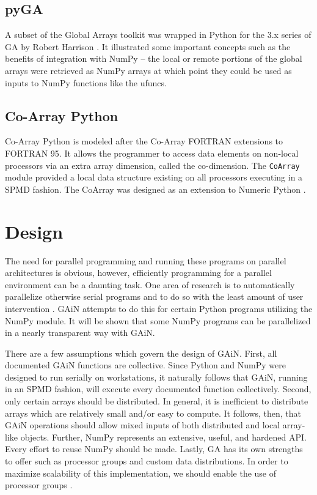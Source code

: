 \documentclass{sigplanconf}
\begin{document}
\subsection{pyGA}

A subset of the Global Arrays toolkit was wrapped in Python for the 3.x series
of GA by Robert Harrison \cite{Har99}. It illustrated some important concepts
such as the benefits of integration with NumPy -- the local or remote portions
of the global arrays were retrieved as NumPy arrays at which point they could
be used as inputs to NumPy functions like the ufuncs.

\subsection{Co-Array Python}

Co-Array Python \cite{Ras04} is modeled after the Co-Array FORTRAN extensions
to FORTRAN 95. It allows the programmer to access data elements on non-local
processors via an extra array dimension, called the co-dimension. The
\verb=CoArray= module provided a local data structure existing on all
processors executing in a SPMD fashion. The CoArray was designed as an
extension to Numeric Python \cite{Asc99}.

\section{Design}

The need for parallel programming and running these programs on parallel
architectures is obvious, however, efficiently programming for a parallel
environment can be a daunting task. One area of research is to automatically
parallelize otherwise serial programs and to do so with the least amount of
user intervention \cite{Buy99}. GAiN attempts to do this for certain Python
programs utilizing the NumPy module. It will be shown that some NumPy programs
can be parallelized in a nearly transparent way with GAiN.

There are a few assumptions which govern the design of GAiN. First, all
documented GAiN functions are collective. Since Python and NumPy were designed
to run serially on workstations, it naturally follows that GAiN, running in an
SPMD fashion, will execute every documented function collectively. Second,
only certain arrays should be distributed. In general, it is inefficient to
distribute arrays which are relatively small and/or easy to compute. It
follows, then, that GAiN operations should allow mixed inputs of both
distributed and local array-like objects. Further, NumPy represents an
extensive, useful, and hardened API. Every effort to reuse NumPy should be
made. Lastly, GA has its own strengths to offer such as processor groups and
custom data distributions. In order to maximize scalability of this
implementation, we should enable the use of processor groups \cite{Nie05}.
\end{document}
